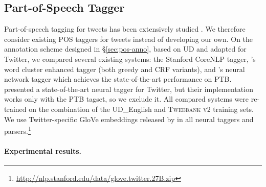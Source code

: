 \documentclass[11pt,a4paper]{article}
\newcommand{\yjcomment}[1]{\textcolor{orange}{[$_\mathrm{L}^\mathrm{Y}$#1]}}
\newcommand{\yicomment}[1]{\textcolor{gray}{[#1 ---\textsc{yi}]}}
\begin{document}
\subsection{Part-of-Speech Tagger}


Part-of-speech tagging for tweets has been extensively studied \cite{ritter-EtAl:2011:EMNLP,gimpel-EtAl:2011:ACL-HLT2011,derczynski-EtAl:2013:RANLP-2013,owoputi-EtAl:2013:NAACL-HLT,gui-EtAl:2017:EMNLP20172}. We therefore consider existing POS taggers for tweets instead of developing our own.
On the annotation scheme designed in \S\ref{sec:pos-anno}, based on UD and adapted for
Twitter, we compared several existing systems: the Stanford CoreNLP tagger, 
\citet{owoputi-EtAl:2013:NAACL-HLT}'s word cluster enhanced tagger
(both greedy and CRF variants), and 
\citet{ma-hovy:2016:P16-1}'s neural network tagger 
which achieves the state-of-the-art performance on PTB.
\citet{gui-EtAl:2017:EMNLP20172} presented a state-of-the-art neural tagger for Twitter,
but their implementation works only with the PTB tagset, so we exclude
it. %
All compared systems were re-trained on the combination of the UD\_English and 
\textsc{Tweebank v2} training sets. We use Twitter-specific GloVe embeddings released by
\citet{pennington-socher-manning:2014:EMNLP2014} in all neural taggers
and parsers.\footnote{\url{http://nlp.stanford.edu/data/glove.twitter.27B.zip}}


\paragraph{Experimental results.}
\end{document}
